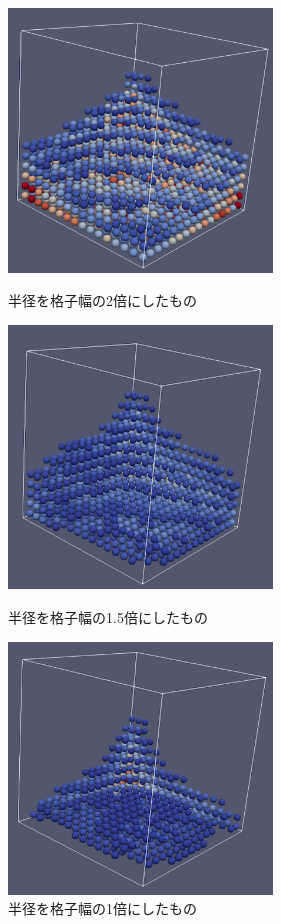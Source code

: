 \documentclass[a4j,12pt]{jreport}
\begin{document}
\begin{figure}[htbp]
  \begin{minipage}[b]{0.45\linewidth}
    \centering
    \includegraphics[width=70mm]{r2.png}
    \caption{半径を格子幅の2倍にしたもの}
  \end{minipage}
  \begin{minipage}[b]{0.45\linewidth}
    \centering
    \includegraphics[width=70mm]{r15.png}
    \caption{半径を格子幅の1.5倍にしたもの}
  \end{minipage}
  \begin{minipage}[b]{0.45\linewidth}
    \centering
    \includegraphics[width=70mm]{r1.png}
    \caption{半径を格子幅の1倍にしたもの}
  \end{minipage}
\end{figure}
\end{document}

